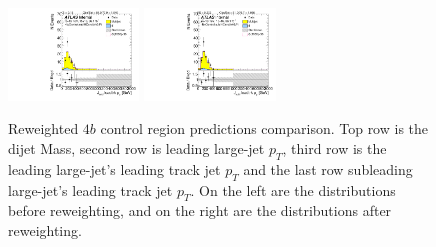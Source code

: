 \begin{figure}[htbp!]
\begin{center}
\includegraphics[width=0.31\textwidth,angle=-90]{figures/boosted/Prereweight/Moriond_FourTag_Control_sublHCand_trk0_Pt.pdf}
\includegraphics[width=0.31\textwidth,angle=-90]{figures/boosted/Control/b77_FourTag_Control_sublHCand_trk0_Pt.pdf}\\
\caption{Reweighted $4b$ control region predictions comparison. Top row is the dijet Mass, second row is leading large-\R jet $p_{T}$, third row is the leading large-\R jet's leading track jet $p_T$ and the last row subleading large-\R jet's leading track jet $p_T$. On the left are the distributions before reweighting, and on the right are the distributions after reweighting.}
\label{fig:rw-4b-comp-cr}
\end{center}
\end{figure}


